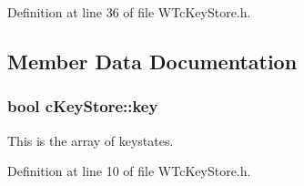 Definition at line 36 of file WTcKeyStore.h.



\subsection{Member Data Documentation}
\hypertarget{classc_key_store_af9ff44bfcc796d0a3804529703a8746d}{
\subsubsection[{key}]{\setlength{\rightskip}{0pt plus 5cm}bool {\bf cKeyStore::key}}}
\label{classc_key_store_af9ff44bfcc796d0a3804529703a8746d}


This is the array of keystates. 



Definition at line 10 of file WTcKeyStore.h.

